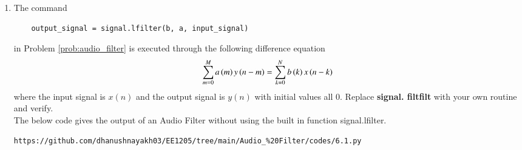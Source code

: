 \documentclass[journal,12pt,twocolumn]{IEEEtran}
\theoremstyle{remark}
\begin{document}
\begin{enumerate}[label=\thesection.\arabic*]
\item
The command
\begin{lstlisting}
	output_signal = signal.lfilter(b, a, input_signal)
	\end{lstlisting}
in Problem \ref{prob:audio_filter} is executed through the following difference equation
\begin{equation}
\label{eq:iir_filter_gen}
    \sum _{m=0}^{M}a\left(m\right)y\left(n-m\right)=\sum _{k=0}^{N}b\left(k\right)x\left(n-k\right) 
\end{equation}
where the input signal is $x(n)$ and the output signal is $y(n)$ with initial values all 0. Replace
\textbf{signal. filtfilt} with your own routine and verify.\\

\solution The below code gives the output of an Audio Filter without using the built in function signal.lfilter.
\begin{lstlisting}
https://github.com/dhanushnayakh03/EE1205/tree/main/Audio_%20Filter/codes/6.1.py 
\end{lstlisting}



\end{enumerate}
\end{document}
